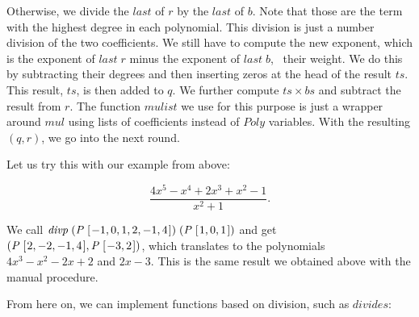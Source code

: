 \documentclass[tikz]{scrreprt}
\newcommand{\Conid}[1]{\mathit{#1}}
\newcommand{\Varid}[1]{\mathit{#1}}
\begin{document}
Otherwise, we divide the \ensuremath{\Varid{last}} of $r$ by the \ensuremath{\Varid{last}} of $b$.
Note that those are the term with the highest degree
in each polynomial.
This division is just a number division of the two
coefficients. We still have to compute the new exponent,
which is the exponent of \ensuremath{\Varid{last}\;\Varid{r}} minus the exponent of 
\ensuremath{\Varid{last}\;\Varid{b}}, \ie\ their weight. We do this by subtracting
their degrees and then inserting zeros 
at the head of the result \ensuremath{\Varid{ts}}.
This result, \ensuremath{\Varid{ts}}, is then added to $q$.
We further compute $ts \times bs$ and subtract
the result from $r$. The function \ensuremath{\Varid{mulist}} we use for this purpose
is just a wrapper around \ensuremath{\Varid{mul}} using
lists of coefficients instead of \ensuremath{\Conid{Poly}} variables.
With the resulting $(q,r)$, we go into the next round.

Let us try this with our example from above: 

\[
\frac{4x^5 - x^4 + 2x^3 + x^2 - 1}{x^2 + 1}.
\]

We call \ensuremath{\Varid{divp}\;(\Conid{P}\;[\mskip1.5mu \mathbin{-}\mathrm{1},\mathrm{0},\mathrm{1},\mathrm{2},\mathbin{-}\mathrm{1},\mathrm{4}\mskip1.5mu])\;(\Conid{P}\;[\mskip1.5mu \mathrm{1},\mathrm{0},\mathrm{1}\mskip1.5mu])} and get
\ensuremath{(\Conid{P}\;[\mskip1.5mu \mathrm{2},\mathbin{-}\mathrm{2},\mathbin{-}\mathrm{1},\mathrm{4}\mskip1.5mu],\Conid{P}\;[\mskip1.5mu \mathbin{-}\mathrm{3},\mathrm{2}\mskip1.5mu])}, which translates to the polynomials
$4x^3-x^2-2x+2$ and $2x - 3$. 
This is the same result we obtained above 
with the manual procedure.

From here on, we can implement functions based on division,
such as \ensuremath{\Varid{divides}}:
\end{document}
